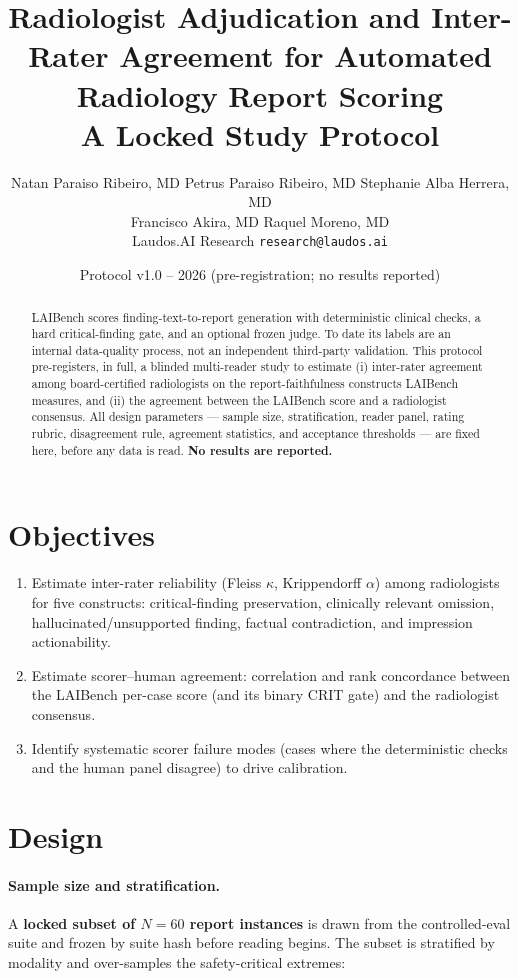 \documentclass[11pt]{article}
\title{Radiologist Adjudication and Inter-Rater Agreement for Automated Radiology Report Scoring\\[4pt]\large A Locked Study Protocol}
\author{
  Natan Paraiso Ribeiro, MD \quad Petrus Paraiso Ribeiro, MD \quad Stephanie Alba Herrera, MD \\
  Francisco Akira, MD \quad Raquel Moreno, MD \\[6pt]
  \normalsize Laudos.AI Research \quad\textbullet\quad \texttt{research@laudos.ai}
}
\date{Protocol v1.0 -- 2026 (pre-registration; no results reported)}
\begin{document}
\maketitle

\begin{abstract}
LAIBench scores finding-text-to-report generation with deterministic clinical checks, a hard critical-finding gate, and an optional frozen judge. To date its labels are an internal data-quality process, not an independent third-party validation. This protocol pre-registers, in full, a blinded multi-reader study to estimate (i) inter-rater agreement among board-certified radiologists on the report-faithfulness constructs LAIBench measures, and (ii) the agreement between the LAIBench score and a radiologist consensus. All design parameters --- sample size, stratification, reader panel, rating rubric, disagreement rule, agreement statistics, and acceptance thresholds --- are fixed here, before any data is read. \textbf{No results are reported.}
\end{abstract}

\section{Objectives}
\begin{enumerate}[leftmargin=*]
\item Estimate inter-rater reliability (Fleiss $\kappa$, Krippendorff $\alpha$) among radiologists for five constructs: critical-finding preservation, clinically relevant omission, hallucinated/unsupported finding, factual contradiction, and impression actionability.
\item Estimate scorer--human agreement: correlation and rank concordance between the LAIBench per-case score (and its binary CRIT gate) and the radiologist consensus.
\item Identify systematic scorer failure modes (cases where the deterministic checks and the human panel disagree) to drive calibration.
\end{enumerate}

\section{Design}

\paragraph{Sample size and stratification.} A \textbf{locked subset of $N=60$ report instances} is drawn from the controlled-eval suite and frozen by suite hash before reading begins. The subset is stratified by modality and over-samples the safety-critical extremes:
\end{document}
